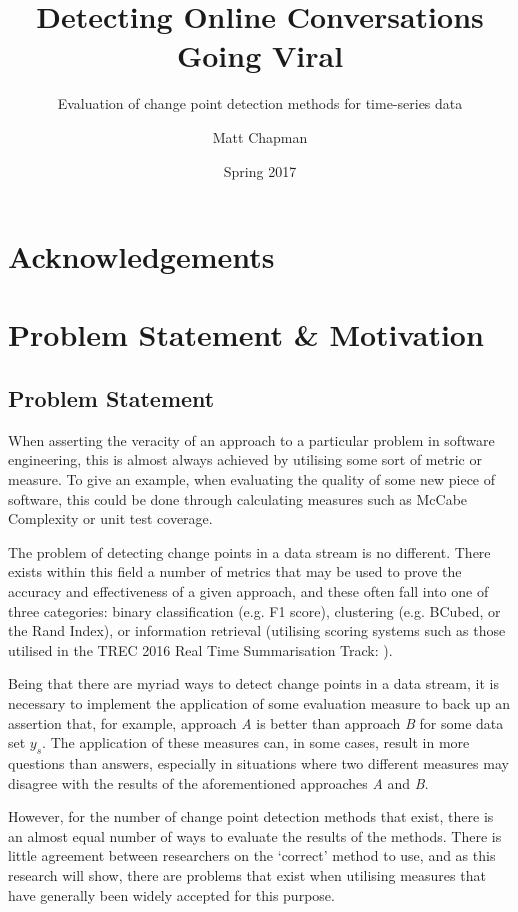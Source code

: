 \documentclass{uvamscse}	%
\title{Detecting Online Conversations Going Viral}
\subtitle{Evaluation of change point detection methods for time-series data}
\date{Spring 2017}
\author{Matt Chapman}
\begin{document}
\maketitle


\chapter*{Acknowledgements}

\chapter{Problem Statement \& Motivation}

\section{Problem Statement}
\label{Problem Statement}

When asserting the veracity of an approach to a particular problem in software engineering, this is almost always achieved by utilising some sort of metric or measure. To give an example, when evaluating the quality of some new piece of software, this could be done through calculating measures such as McCabe Complexity \cite{ThomasJ.McCabe1976} or unit test coverage.

The problem of detecting change points in a data stream is no different. There exists within this field a number of metrics that may be used to prove the accuracy and effectiveness of a given approach, and these often fall into one of three categories: binary classification (e.g. F1 score), clustering (e.g. BCubed, or the Rand Index), or information retrieval (utilising scoring systems such as those utilised in the TREC 2016 Real Time Summarisation Track: \cite{trec2016}).

Being that there are myriad ways to detect change points in a data stream, it is necessary to implement the application of some evaluation measure to back up an assertion that, for example, approach \emph{A} is better than approach \emph{B} for some data set $y_s$. The application of these measures can, in some cases, result in more questions than answers, especially in situations where two different measures may disagree with the results of the aforementioned approaches \emph{A} and \emph{B}.

However, for the number of change point detection methods that exist, there is an almost equal number of ways to evaluate the results of the methods. There is little agreement between researchers on the `correct' method to use, and as this research will show, there are problems that exist when utilising measures that have generally been widely accepted for this purpose.
\end{document}
